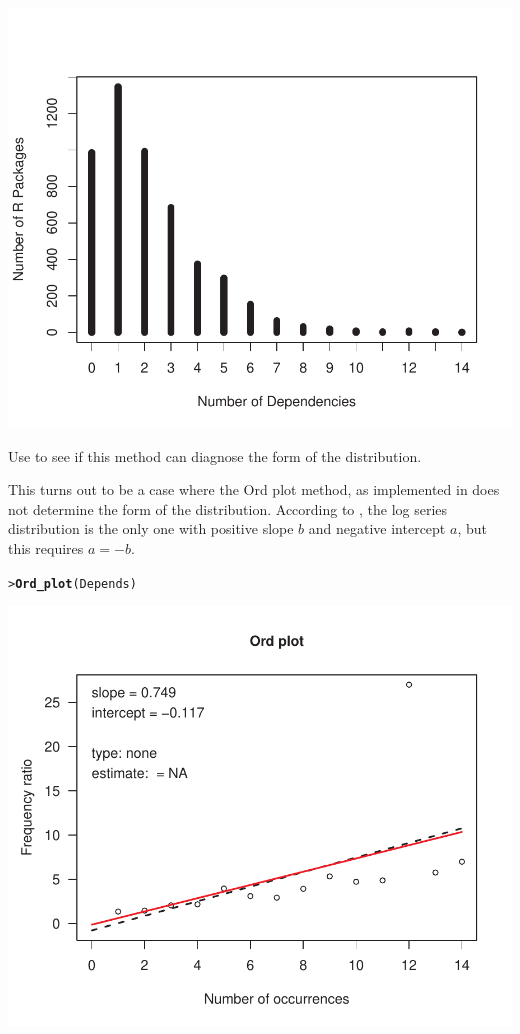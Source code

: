 \documentclass[10pt]{report}\usepackage[]{graphicx}\usepackage[]{color}
\makeatletter
\newcommand{\hlstd}[1]{\textcolor[rgb]{0.345,0.345,0.345}{#1}}%
\newcommand{\hlkwd}[1]{\textcolor[rgb]{0.737,0.353,0.396}{\textbf{#1}}}%
\newenvironment{kframe}{%
 \def\at@end@of@kframe{}%
 \ifinner\ifhmode%
  \def\at@end@of@kframe{\end{minipage}}%
  \begin{minipage}{\columnwidth}%
 \fi\fi%
 \def\FrameCommand##1{\hskip\@totalleftmargin \hskip-\fboxsep
 \colorbox{shadecolor}{##1}\hskip-\fboxsep
     \hskip-\linewidth \hskip-\@totalleftmargin \hskip\columnwidth}%
 \MakeFramed {\advance\hsize-\width
   \@totalleftmargin\z@ \linewidth\hsize
   \@setminipage}}%
 {\par\unskip\endMakeFramed%
 \at@end@of@kframe}
\newenvironment{knitrout}{}{} %
\renewenvironment{knitrout}{\small\renewcommand{\baselinestretch}{.85}}{} %
\makeatother
\begin{document}
\begin{Exercises}
\begin{enumerate*}
\begin{ans}
\begin{knitrout}
\centerline{\includegraphics[width=.5\textwidth]{soln/fig/ex3_11a-1} }



\end{knitrout}
      \end{ans}
      
      \item Use  to see if this method can diagnose the form of the distribution.
      \begin{ans}
      This turns out to be a case where the Ord plot method, as implemented in
       does not determine the form of the distribution.  According to 
      , the log series distribution is the only one with positive
      slope $b$ and negative intercept $a$, but this requires $a = -b$. 
\begin{knitrout}\footnotesize
{}\color{fgcolor}\begin{kframe}
\begin{alltt}
\hlstd{> }\hlkwd{Ord_plot}\hlstd{(Depends)}
\end{alltt}
\end{kframe}

\centerline{\includegraphics[width=.5\textwidth]{soln/fig/ex3_11b-1} }



\end{knitrout}
      \end{ans}
      

\end{enumerate*}
\end{Exercises}
\end{document}
